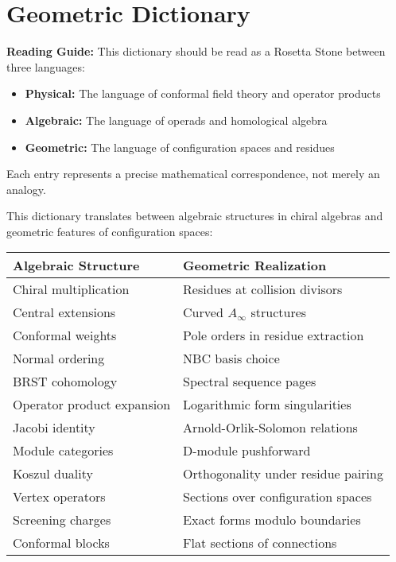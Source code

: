 \appendix
\chapter{Geometric Dictionary}

\textbf{Reading Guide:} This dictionary should be read as a Rosetta Stone between three languages:
\begin{itemize}
\item \textbf{Physical:} The language of conformal field theory and operator products
\item \textbf{Algebraic:} The language of operads and homological algebra  
\item \textbf{Geometric:} The language of configuration spaces and residues
\end{itemize}
Each entry represents a precise mathematical correspondence, not merely an analogy.


This dictionary translates between algebraic structures in chiral algebras and geometric features of configuration spaces:

\begin{center}
\begin{tabular}{|l|l|}
\hline
\textbf{Algebraic Structure} & \textbf{Geometric Realization} \\
\hline
Chiral multiplication & Residues at collision divisors \\
Central extensions & Curved $A_\infty$ structures \\
Conformal weights & Pole orders in residue extraction \\
Normal ordering & NBC basis choice \\
BRST cohomology & Spectral sequence pages \\
Operator product expansion & Logarithmic form singularities \\
Jacobi identity & Arnold-Orlik-Solomon relations \\
Module categories & D-module pushforward \\
Koszul duality & Orthogonality under residue pairing \\
Vertex operators & Sections over configuration spaces \\
Screening charges & Exact forms modulo boundaries \\
Conformal blocks & Flat sections of connections \\
\hline
\end{tabular}
\end{center}

